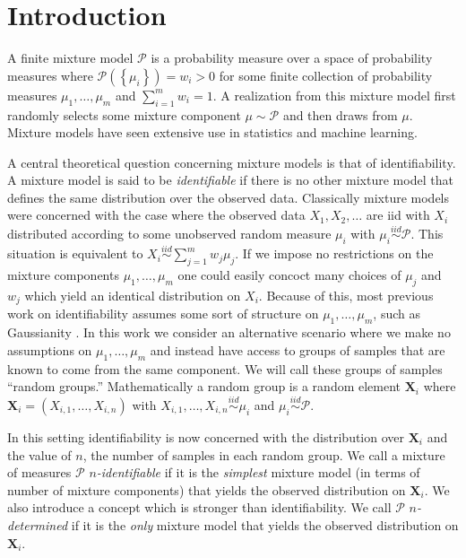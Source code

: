 \documentclass[aos,preprint]{imsart}
\def\sP{\mathscr{P}}
\def\bX{\mathbf{X}}
\def\simiid{\overset{iid}{\sim}}
\theoremstyle{plain}
\theoremstyle{defintion}
\begin{document}
\section{Introduction}
A finite mixture model $\sP$ is a probability measure over a space of probability measures where $\sP\left( \left\{ \mu_i \right\} \right)=w_i >0$ for some finite collection of probability measures $\mu_1,\ldots,\mu_m$ and $\sum_{i=1}^m w_i = 1$. A realization from this mixture model first randomly selects some mixture component $\mu \sim \sP$ and then draws from $\mu$. Mixture models have seen extensive use in statistics and machine learning.

A central theoretical question concerning mixture models is that of identifiability. A mixture model is said to be {\em identifiable} if there is no other mixture model that defines the same distribution over the observed data. Classically mixture models were concerned with the case where the observed data $X_1,X_2,\ldots$ are iid with $X_i$ distributed according to some unobserved random measure $\mu_i$ with $\mu_i\simiid \sP$. This situation is equivalent to $X_i \simiid \sum_{j=1}^m w_j \mu_j$. If we impose no restrictions on the mixture components $\mu_1,\ldots,\mu_m$ one could easily concoct many choices of $\mu_j$ and $w_j$ which yield an identical distribution on $X_i$. Because of this, most previous work on identifiability assumes some sort of structure on $\mu_1,\ldots,\mu_m$, such as Gaussianity \cite{anderson14,bruni85, yakowitz68}. In this work we consider an alternative scenario where we make no assumptions on $\mu_1,\ldots,\mu_m$ and instead have access to groups of samples that are known to come from the same component. We will call these groups of samples ``random groups.'' Mathematically a random group is a random element $\bX_i$ where $\bX_i = \left( X_{i,1},\ldots,X_{i,n} \right)$ with $X_{i,1},\ldots,X_{i,n}\simiid \mu_i$ and $\mu_i \simiid \sP$.

In this setting identifiability is now concerned with the distribution over $\bX_i$ and the value of $n$, the number of samples in each random group. We call a mixture of measures $\sP$ {\em $n$-identifiable} if it is the {\em simplest} mixture model (in terms of number of mixture components) that yields the observed distribution on $\bX_i$. We also introduce a concept which is stronger than identifiability. We call $\sP$ {\em $n$-determined} if it is the {\em only} mixture model that yields the observed distribution on $\bX_i$. 
\end{document}
